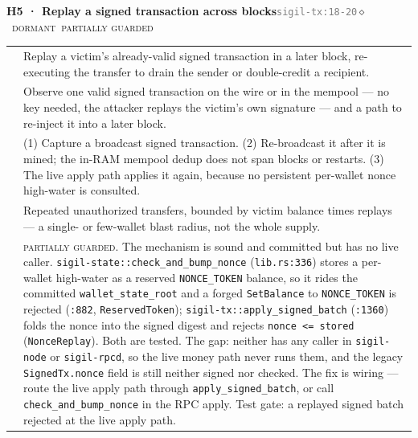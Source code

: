\documentclass[10pt,a4paper]{article}
\makeatletter
\newcommand{\stD}{\textcolor{sigilviolet}{$\diamond$}~{\scriptsize\textcolor{sigilviolet}{\textsc{dormant}}}}
\newcommand{\svMod}{{\scriptsize\textcolor{sigilblue}{\textsc{moderate}}}}
\newcommand{\mgPartial}{{\scriptsize\textcolor{sigilviolet}{\textsc{partially guarded}}}}
\newcommand{\frow}[2]{{\footnotesize\textcolor{gray}{\textsc{#1}}}\;&\small #2\\}
\newenvironment{atkentry}[5]{%
\begin{tcolorbox}[enhanced,breakable,colback=white,colframe=slate,boxrule=0.6pt,arc=2pt,
  left=8pt,right=8pt,top=6pt,bottom=6pt,
  borderline west={3pt}{0pt}{sigilred!60!slate}]
{\small\textbf{#1 · #2}\hfill{\footnotesize\textcolor{gray}{\texttt{#3}}}\quad#4\quad#5}\\[4pt]
\begin{tabular}{@{}>{\raggedleft\arraybackslash}p{2.1cm}p{12.9cm}@{}}
}{%
\end{tabular}
\end{tcolorbox}\vspace{2pt}}
\makeatother
\begin{document}
\begin{atkentry}{H5}{Replay a signed transaction across blocks}{sigil-tx:18-20}{\svMod}{\stD~\mgPartial}
\frow{goal}{Replay a victim's already-valid signed transaction in a later block,
re-executing the transfer to drain the sender or double-credit a recipient.}
\frow{preconditions}{Observe one valid signed transaction on the wire or in the mempool —
no key needed, the attacker replays the victim's own signature — and a path to re-inject it
into a later block.}
\frow{steps}{(1) Capture a broadcast signed transaction. (2) Re-broadcast it after it is
mined; the in-RAM mempool dedup does not span blocks or restarts. (3) The live apply path
applies it again, because no persistent per-wallet nonce high-water is consulted.}
\frow{buys}{Repeated unauthorized transfers, bounded by victim balance times replays — a
single- or few-wallet blast radius, not the whole supply.}
\frow{defense}{\mgPartial{}. The mechanism is sound and committed but has no live caller.
\texttt{sigil-state::check\_and\_bump\_nonce} (\texttt{lib.rs:336}) stores a per-wallet
high-water as a reserved \texttt{NONCE\_TOKEN} balance, so it rides the committed
\texttt{wallet\_state\_root} and a forged \texttt{SetBalance} to \texttt{NONCE\_TOKEN} is
rejected (\texttt{:882}, \texttt{ReservedToken}); \texttt{sigil-tx::apply\_signed\_batch}
(\texttt{:1360}) folds the nonce into the signed digest and rejects \texttt{nonce <= stored}
(\texttt{NonceReplay}). Both are tested. The gap: neither has any caller in
\texttt{sigil-node} or \texttt{sigil-rpcd}, so the live money path never runs them, and the
legacy \texttt{SignedTx.nonce} field is still neither signed nor checked. The fix is
wiring — route the live apply path through \texttt{apply\_signed\_batch}, or call
\texttt{check\_and\_bump\_nonce} in the RPC apply. Test gate: a replayed signed batch
rejected at the live apply path.}
\end{atkentry}
\end{document}
